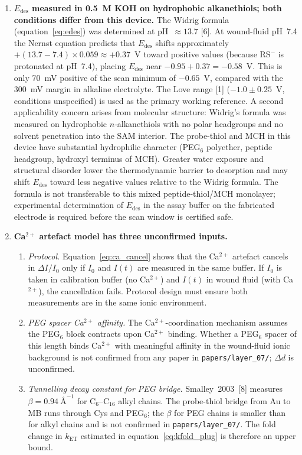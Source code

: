 \documentclass[10pt,a4paper]{article}
\numberwithin{equation}{section}
\newcommand{\cit}[1]{[#1]}   %
\newcommand{\As}{\text{\AA}^{-1}}
\begin{document}
\begin{enumerate}[noitemsep]
  \item \textbf{$E_{\mathrm{des}}$ measured in 0.5~M KOH on hydrophobic alkanethiols;
    both conditions differ from this device.}
    The Widrig formula (equation~\ref{eq:edes}) was determined at pH~$\approx 13.7$ \cit{6}.
    At wound-fluid pH~7.4 the Nernst equation predicts that $E_{\mathrm{des}}$ shifts
    approximately $+(13.7 - 7.4) \times 0.059 \approx +0.37$~V toward positive values
    (because RS$^-$ is protonated at pH~7.4), placing $E_{\mathrm{des}}$ near
    $-0.95 + 0.37 = -0.58$~V. This is only 70~mV positive of the scan minimum of
    $-0.65$~V, compared with the 300~mV margin in alkaline electrolyte.
    The Love range \cit{1} ($-1.0 \pm 0.25$~V, conditions unspecified) is used as the
    primary working reference.
    A second applicability concern arises from molecular structure: Widrig's formula was
    measured on hydrophobic $n$-alkanethiols with no polar headgroups and no solvent
    penetration into the SAM interior. The probe-thiol and MCH in this device have
    substantial hydrophilic character (PEG$_6$ polyether, peptide headgroup, hydroxyl
    terminus of MCH). Greater water exposure and structural disorder lower the
    thermodynamic barrier to desorption and may shift $E_{\text{des}}$ toward less
    negative values relative to the Widrig formula. The formula is not transferable to
    this mixed peptide-thiol/MCH monolayer; experimental determination of
    $E_{\text{des}}$ in the assay buffer on the fabricated electrode is required before
    the scan window is certified safe.

  \item \textbf{Ca$^{2+}$ artefact model has three unconfirmed inputs.}
    \begin{enumerate}[label=(\alph*),noitemsep]
      \item \textit{Protocol.} Equation~\eqref{eq:ca_cancel} shows that the Ca$^{2+}$
        artefact cancels in $\Delta I/I_0$ only if $I_0$ and $I(t)$ are measured in
        the same buffer. If $I_0$ is taken in calibration buffer (no Ca$^{2+}$) and
        $I(t)$ in wound fluid (with Ca$^{2+}$), the cancellation fails. Protocol design
        must ensure both measurements are in the same ionic environment.
      \item \textit{PEG spacer Ca$^{2+}$ affinity.} The Ca$^{2+}$-coordination
        mechanism assumes the PEG$_6$ block contracts upon Ca$^{2+}$ binding. Whether
        a PEG$_6$ spacer of this length binds Ca$^{2+}$ with meaningful affinity in
        the wound-fluid ionic background is not confirmed from any paper in
        \texttt{papers/layer\_07/}; $\Delta d$ is unconfirmed.
      \item \textit{Tunnelling decay constant for PEG bridge.} Smalley~2003~\cit{8}
        measures $\beta = 0.94\ \As$ for C$_6$--C$_{16}$ alkyl chains. The probe-thiol
        bridge from Au to MB runs through Cys and PEG$_6$; the $\beta$ for PEG chains
        is smaller than for alkyl chains and is not confirmed in \texttt{papers/layer\_07/}.
        The fold change in $k_{\mathrm{ET}}$ estimated in equation~\eqref{eq:kfold_plug}
        is therefore an upper bound.
    \end{enumerate}


\end{enumerate}
\end{document}
